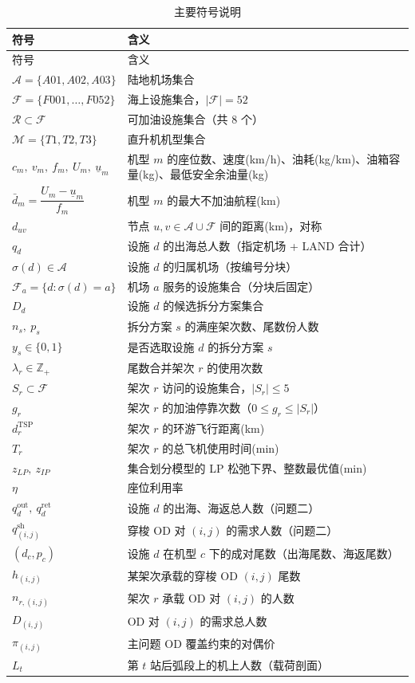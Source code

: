 \documentclass[UTF8,zihao=-4]{ctexart}
\numberwithin{figure}{section}
\numberwithin{table}{section}
\begin{document}
\begin{longtable}{p{3.4cm}@{\qquad}p{10.2cm}}
  \caption{主要符号说明}\label{tab:symbols}\\
  \toprule
  符号 & 含义 \\
  \midrule
  \endfirsthead
  \toprule
  符号 & 含义 \\
  \midrule
  \endhead
  $\mathcal{A}=\{A01,A02,A03\}$ & 陆地机场集合 \\
  $\mathcal{F}=\{F001,\dots,F052\}$ & 海上设施集合，$|\mathcal{F}|=52$ \\
  $\mathcal{R}\subset\mathcal{F}$ & 可加油设施集合（共 8 个） \\
  $\mathcal{M}=\{T1,T2,T3\}$ & 直升机机型集合 \\
  \midrule
  $c_m,\ v_m,\ f_m,\ U_m,\ \underline{u}_m$ & 机型 $m$ 的座位数、速度(km/h)、油耗(kg/km)、油箱容量(kg)、最低安全余油量(kg) \\
  $\bar{d}_m=\dfrac{U_m-\underline{u}_m}{f_m}$ & 机型 $m$ 的最大不加油航程(km) \\
  $d_{uv}$ & 节点 $u,v\in\mathcal{A}\cup\mathcal{F}$ 间的距离(km)，对称 \\
  $q_d$ & 设施 $d$ 的出海总人数（指定机场 + LAND 合计） \\
  $\sigma(d)\in\mathcal{A}$ & 设施 $d$ 的归属机场（按编号分块） \\
  $\mathcal{F}_a=\{d:\sigma(d)=a\}$ & 机场 $a$ 服务的设施集合（分块后固定） \\
  $D_d$ & 设施 $d$ 的候选拆分方案集合 \\
  $n_s,\ p_s$ & 拆分方案 $s$ 的满座架次数、尾数份人数 \\
  \midrule
  $y_s\in\{0,1\}$ & 是否选取设施 $d$ 的拆分方案 $s$ \\
  $\lambda_r\in\mathbb{Z}_+$ & 尾数合并架次 $r$ 的使用次数 \\
  \midrule
  $S_r\subset\mathcal{F}$ & 架次 $r$ 访问的设施集合，$|S_r|\le 5$ \\
  $g_r$ & 架次 $r$ 的加油停靠次数（$0\le g_r\le |S_r|$） \\
  $d_r^{\mathrm{TSP}}$ & 架次 $r$ 的环游飞行距离(km) \\
  $T_r$ & 架次 $r$ 的总飞机使用时间(min) \\
  \midrule
  $z_{LP},\ z_{IP}$ & 集合划分模型的 LP 松弛下界、整数最优值(min) \\
  $\eta$ & 座位利用率 \\
  \midrule
  $q_d^{\mathrm{out}},\ q_d^{\mathrm{ret}}$ & 设施 $d$ 的出海、海返总人数（问题二） \\
  $q^{\mathrm{sh}}_{(i,j)}$ & 穿梭 OD 对 $(i,j)$ 的需求人数（问题二） \\
  $(d_c,p_c)$ & 设施 $d$ 在机型 $c$ 下的成对尾数（出海尾数、海返尾数） \\
  $h_{(i,j)}$ & 某架次承载的穿梭 OD $(i,j)$ 尾数 \\
  $n_{r,(i,j)}$ & 架次 $r$ 承载 OD 对 $(i,j)$ 的人数 \\
  $D_{(i,j)}$ & OD 对 $(i,j)$ 的需求总人数 \\
  $\pi_{(i,j)}$ & 主问题 OD 覆盖约束的对偶价 \\
  $L_t$ & 第 $t$ 站后弧段上的机上人数（载荷剖面） \\
  \bottomrule
\end{longtable}
\end{document}
